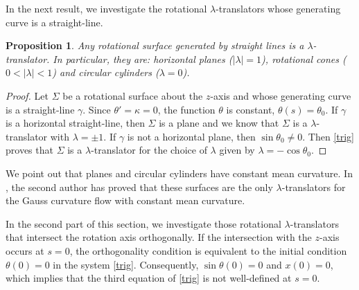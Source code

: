 \documentclass[12pt]{amsart}
\newtheorem{proposition}[theorem]{Proposition}
\theoremstyle{definition}
\begin{document}
In the next result, we investigate the  rotational $\lambda$-translators  whose generating curve is  a straight-line.

\begin{proposition} \label{pr-str}
Any rotational surface generated by straight lines is a $\lambda$-translator. In particular, they are: horizontal planes ($|\lambda|=1$), rotational cones ($0<|\lambda|<1$) and circular cylinders ($\lambda=0$).
\end{proposition}

\begin{proof} Let $\Sigma$ be a rotational surface about the $z$-axis and whose generating curve is a straight-line $\gamma$. Since $\theta'=\kappa=0$, the function $\theta$ is   constant, $\theta(s)=\theta_0$. If $\gamma$ is a horizontal straight-line, then $\Sigma$ is a plane and we know that $\Sigma$ is a $\lambda$-translator with $\lambda=\pm 1$. If $\gamma$ is not a horizontal plane, then  $\sin\theta_0\not=0$. Then \eqref{trig} proves that   $\Sigma$ is a $\lambda$-translator for the choice of $\lambda$ given by  $\lambda=-\cos\theta_0$. 
 \end{proof}


We point out that planes and circular cylinders have constant mean curvature. In \cite{lo3}, the second author has proved that these surfaces are the only $\lambda$-translators for the Gauss curvature flow with constant mean curvature.  
 
 In the second part of this section, we investigate those rotational $\lambda$-translators that intersect the rotation axis orthogonally.    If the intersection with the $z$-axis occurs at $s=0$, the orthogonality condition is equivalent to  the initial condition $\theta(0)=0$ in the system \eqref{trig}. Consequently, $\sin\theta(0)=0$ and $x(0)=0$, which implies that the third equation of \eqref{trig}  is not well-defined at $s=0$.    
\end{document}
